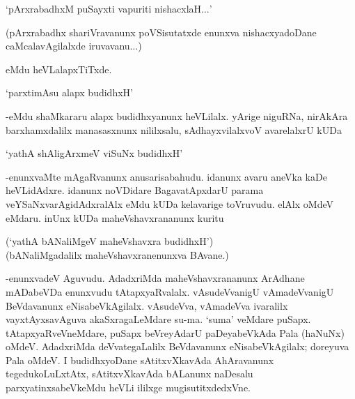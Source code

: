 \begin{shloka}
`pArxrabadhxM puSayxti vapuriti nishacxlaH$\ldots$'
\end{shloka}

(pArxrabadhx shariVravanunx poVSisutatxde enunxva nishacxyadoDane caMcalavAgilalxde iruvavanu$\ldots$)

eMdu heVLalapxTiTxde.

\begin{shloka}
`parxtimAsu alapx budidhxH'
\end{shloka}

-eMdu shaMkararu alapx budidhxyanunx heVLilalx. yArige niguRNa, nirAkAra barxhamxdalilx manasasxnunx nililxsalu, sAdhayxvilalxvoV avarelalxrU kUDa

\begin{shloka}
`yathA shAligArxmeV viSuNx budidhxH'
\end{shloka}

-enunxvaMte mAgaRvanunx anusarisabahudu. idanunx avaru aneVka kaDe heVLidAdxre. idanunx noVDidare BagavatApxdarU parama veYSaNxvarAgidAdxralAlx eMdu kUDa kelavarige toVruvudu. elAlx oMdeV eMdaru. inUnx kUDa maheVshavxrananunx kuritu


\begin{shloka}
(`yathA bANaliMgeV maheVshavxra budidhxH')\\
(bANaliMgadalilx maheVshavxranenunxva BAvane.)
\end{shloka}

-enunxvadeV Aguvudu. AdadxriMda maheVshavxrananunx ArAdhane mADabeVDa enunxvudu tAtapxyaRvalalx. vAsudeVvanigU vAmadeVvanigU BeVdavanunx eNisabeVkAgilalx. vAsudeVva, vAmadeVva ivaralilx vayxtAyxsavAguva akaSxragaLeMdare su-ma. `suma' veMdare puSapx. tAtapxyaRveVneMdare, puSapx beVreyAdarU paDeyabeVkAda Pala (haNuNx) oMdeV. AdadxriMda deVvategaLalilx BeVdavanunx eNisabeVkAgilalx; doreyuva Pala oMdeV. I budidhxyoDane sAtitxvXkavAda AhAravanunx tegedukoLuLxtAtx, sAtitxvXkavAda bALanunx naDesalu parxyatinxsabeVkeMdu heVLi ililxge mugisutitxdedxVne.



\endchapter
